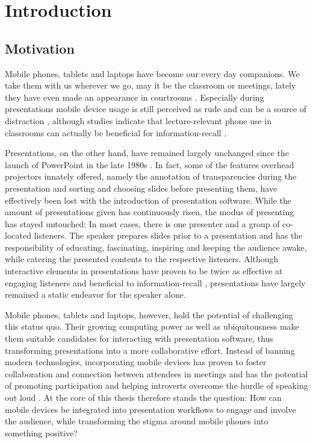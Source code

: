 \chapter{Introduction}
\label{cha:introduction}

\section{Motivation}

Mobile phones, tablets and laptops have become our every day companions. We take them with us wherever we go, may it be the classroom or meetings, lately they have even made an appearance in courtrooms \cite{Farrell:TrialByTablet}. Especially during presentations mobile device usage is still perceived as rude and can be a source of distraction \cite{Bohmer:SmartphoneUseRude, Bajko:ComparativePerceptionSmartphoneMeeting, Kuznekoff:ImpactPhoneStudentLearning}, although studies indicate that lecture-relevant phone use in classrooms can actually be beneficial for information-recall \cite{Kuznekoff:MobilePhoneClassroomTwitter}.

Presentations, on the other hand, have remained largely unchanged since the launch of PowerPoint in the late 1980s \cite{Yates:PowerPoint}. In fact, some of the features overhead projectors innately offered, namely the annotation of transparencies during the presentation and sorting and choosing slides before presenting them, have effectively been lost with the introduction of presentation software. While the amount of presentations given has continuously risen, the modus of presenting has stayed untouched: In most cases, there is one presenter and a group of co-located listeners. The speaker prepares slides prior to a presentation and has the responsibility of educating, fascinating, inspiring and keeping the audience awake, while catering the presented contents to the respective listeners. Although interactive elements in presentations have proven to be twice as effective at engaging listeners and beneficial to information-recall \cite{prezi-science}, presentations have largely remained a static endeavor for the speaker alone.

Mobile phones, tablets and laptops, however, hold the potential of challenging this status quo. Their growing computing power as well as ubiquitousness make them suitable candidates for interacting with presentation software, thus transforming presentations into a more collaborative effort. Instead of banning modern technologies, incorporating mobile devices has proven to foster collaboration and connection between attendees in meetings \cite{Bohmer:SmartphoneUseRude} and has the potential of promoting participation and helping introverts overcome the hurdle of speaking out loud \cite{Bry:Backstage}. At the core of this thesis therefore stands the question: How can mobile devices be integrated into presentation workflows to engage and involve the audience, while transforming the stigma around mobile phones into something positive?

